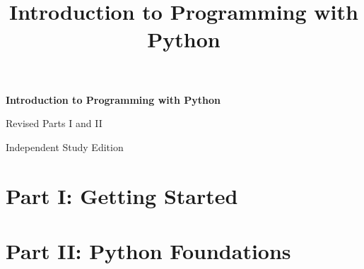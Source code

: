 \documentclass{textbook}
\title{Introduction to Programming with Python}
\providecommand{\toc}{\tableofcontents}
\begin{document}
\begin{titlepage}
    \centering
    \vspace*{0.22\textheight}
    {\Huge\bfseries Introduction to Programming with Python\par}
    \vspace{1.2em}
    {\Large Revised Parts I and II\par}
    \vspace{0.8em}
    {\large Independent Study Edition\par}
    \vfill
\end{titlepage}

\toc
\clearpage

\part{Part I: Getting Started}


\part{Part II: Python Foundations}




\end{document}

